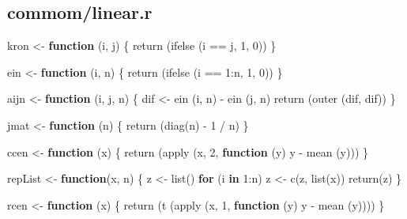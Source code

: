 \documentclass[
  12pt,
]{book}
\newenvironment{Shaded}{\begin{snugshade}}{\end{snugshade}}
\newcommand{\ControlFlowTok}[1]{\textcolor[rgb]{0.13,0.29,0.53}{\textbf{#1}}}
\newcommand{\DecValTok}[1]{\textcolor[rgb]{0.00,0.00,0.81}{#1}}
\newcommand{\FunctionTok}[1]{\textcolor[rgb]{0.00,0.00,0.00}{#1}}
\newcommand{\NormalTok}[1]{#1}
\newcommand{\OtherTok}[1]{\textcolor[rgb]{0.56,0.35,0.01}{#1}}
\newcommand{\SpecialCharTok}[1]{\textcolor[rgb]{0.00,0.00,0.00}{#1}}
\theoremstyle{definition}
\theoremstyle{definition}
\theoremstyle{definition}
\theoremstyle{definition}
\theoremstyle{remark}
\begin{document}
\hypertarget{aplinearcode}{%
\subsection{commom/linear.r}\label{aplinearcode}}

\begin{Shaded}
\begin{Highlighting}[]
\NormalTok{kron }\OtherTok{\textless{}{-}} \ControlFlowTok{function}\NormalTok{ (i, j) \{}
  \FunctionTok{return}\NormalTok{ (}\FunctionTok{ifelse}\NormalTok{ (i }\SpecialCharTok{==}\NormalTok{ j, }\DecValTok{1}\NormalTok{, }\DecValTok{0}\NormalTok{))}
\NormalTok{\}}

\NormalTok{ein }\OtherTok{\textless{}{-}} \ControlFlowTok{function}\NormalTok{ (i, n) \{}
  \FunctionTok{return}\NormalTok{ (}\FunctionTok{ifelse}\NormalTok{ (i }\SpecialCharTok{==} \DecValTok{1}\SpecialCharTok{:}\NormalTok{n, }\DecValTok{1}\NormalTok{, }\DecValTok{0}\NormalTok{))}
\NormalTok{\}}

\NormalTok{aijn }\OtherTok{\textless{}{-}} \ControlFlowTok{function}\NormalTok{ (i, j, n) \{}
\NormalTok{  dif }\OtherTok{\textless{}{-}} \FunctionTok{ein}\NormalTok{ (i, n) }\SpecialCharTok{{-}} \FunctionTok{ein}\NormalTok{ (j, n)}
  \FunctionTok{return}\NormalTok{ (}\FunctionTok{outer}\NormalTok{ (dif, dif))}
\NormalTok{\}}

\NormalTok{jmat }\OtherTok{\textless{}{-}} \ControlFlowTok{function}\NormalTok{ (n) \{}
  \FunctionTok{return}\NormalTok{ (}\FunctionTok{diag}\NormalTok{(n) }\SpecialCharTok{{-}} \DecValTok{1} \SpecialCharTok{/}\NormalTok{ n)}
\NormalTok{\}}

\NormalTok{ccen }\OtherTok{\textless{}{-}} \ControlFlowTok{function}\NormalTok{ (x) \{}
  \FunctionTok{return}\NormalTok{ (}\FunctionTok{apply}\NormalTok{ (x, }\DecValTok{2}\NormalTok{, }\ControlFlowTok{function}\NormalTok{ (y)}
\NormalTok{    y }\SpecialCharTok{{-}} \FunctionTok{mean}\NormalTok{ (y)))}
\NormalTok{\}}

\NormalTok{repList }\OtherTok{\textless{}{-}} \ControlFlowTok{function}\NormalTok{(x, n) \{}
\NormalTok{  z }\OtherTok{\textless{}{-}} \FunctionTok{list}\NormalTok{()}
  \ControlFlowTok{for}\NormalTok{ (i }\ControlFlowTok{in} \DecValTok{1}\SpecialCharTok{:}\NormalTok{n)}
\NormalTok{    z }\OtherTok{\textless{}{-}} \FunctionTok{c}\NormalTok{(z, }\FunctionTok{list}\NormalTok{(x))}
  \FunctionTok{return}\NormalTok{(z)}
\NormalTok{\}}

\NormalTok{rcen }\OtherTok{\textless{}{-}} \ControlFlowTok{function}\NormalTok{ (x) \{}
  \FunctionTok{return}\NormalTok{ (}\FunctionTok{t}\NormalTok{ (}\FunctionTok{apply}\NormalTok{ (x, }\DecValTok{1}\NormalTok{, }\ControlFlowTok{function}\NormalTok{ (y)}
\NormalTok{    y }\SpecialCharTok{{-}} \FunctionTok{mean}\NormalTok{ (y))))}
\NormalTok{\}}


\end{Highlighting}
\end{Shaded}
\end{document}
